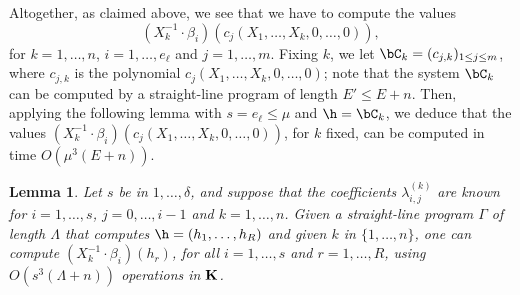 \documentclass[12pt]{article}
\newtheorem{lemma}[definition]{Lemma}
\begin{document}
Altogether, as claimed above, we see that we have to compute the
values
$$(X_k^{-1} \cdot \beta_i)(c_j(X_1,\dots,X_k,0,\dots,0)),$$ for
$k=1,\dots,n$, $i=1,\dots,e_\ell$ and $j=1,\dots,m$.  Fixing $k$, we
let $\bC_k = (c_{j,k})_{1 \le j \le m}$, where $c_{j,k}$ is the
polynomial $c_j(X_1,\dots,X_k,0,\dots,0)$; note that the system
$\bC_k$ can be computed by a straight-line program of length
$E'\leq E+n$. Then, applying the following lemma with
$s=e_\ell \le \mu$ and $\h = \bC_k$, we deduce that the values
$(X_k^{-1} \cdot \beta_i)(c_j(X_1,\dots,X_k,0,\dots,0))$, for $k$
fixed, can be computed in time $O(\mu^3 (E+n))$.


\begin{lemma}
  Let $s$ be in $1,\dots,\delta$, and suppose that the coefficients
  $\lambda^{(k)}_{i,j}$ are known for $i=1,\dots,s$, $j=0,\dots,i-1$
  and $k=1,\dots,n$. Given a straight-line program $\Gamma$ of length
  $\Lambda$ that computes $\h=(h_1,\dots,h_R)$ and given $k$ in
  $\{1,\dots,n\}$, one can compute $(X_k^{-1}\cdot \beta_i)(h_r)$, for
  all $i=1,\dots,s$ and $r=1,\dots,R$, using $O(s^3 (\Lambda+n))$
  operations in $\mathbf{K}$.
\end{lemma}
\end{document}
